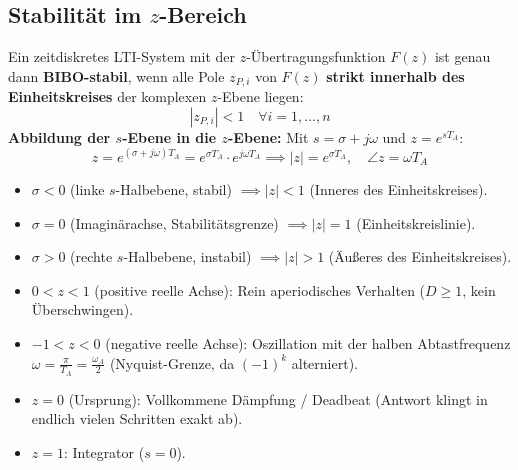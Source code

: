 \subsection{Stabilität im $z$-Bereich}
\begin{tcolorbox}
Ein zeitdiskretes LTI-System mit der $z$-Übertragungsfunktion $F(z)$ ist genau dann \textbf{BIBO-stabil}, wenn alle Pole $z_{P,i}$ von $F(z)$ \textbf{strikt innerhalb des Einheitskreises} der komplexen $z$-Ebene liegen:
\[
|z_{P,i}| < 1 \quad \forall i = 1, \dots, n
\]
\textbf{Abbildung der $s$-Ebene in die $z$-Ebene:}
Mit $s = \sigma + j\omega$ und $z = e^{s T_A}$:
\[
z = e^{(\sigma + j\omega) T_A} = e^{\sigma T_A} \cdot e^{j \omega T_A} \implies |z| = e^{\sigma T_A}, \quad \angle z = \omega T_A
\]
\begin{itemize}
  \item $\sigma < 0$ (linke $s$-Halbebene, stabil) $\implies |z| < 1$ (Inneres des Einheitskreises).
  \item $\sigma = 0$ (Imaginärachse, Stabilitätsgrenze) $\implies |z| = 1$ (Einheitskreislinie).
  \item $\sigma > 0$ (rechte $s$-Halbebene, instabil) $\implies |z| > 1$ (Äußeres des Einheitskreises).
  \item $0 < z < 1$ (positive reelle Achse): Rein aperiodisches Verhalten ($D \ge 1$, kein Überschwingen).
  \item $-1 < z < 0$ (negative reelle Achse): Oszillation mit der halben Abtastfrequenz $\omega = \frac{\pi}{T_A} = \frac{\omega_A}{2}$ (Nyquist-Grenze, da $(-1)^k$ alterniert).
  \item $z = 0$ (Ursprung): Vollkommene Dämpfung / Deadbeat (Antwort klingt in endlich vielen Schritten exakt ab).
  \item $z = 1$: Integrator ($s = 0$).
\end{itemize}
\end{tcolorbox}

